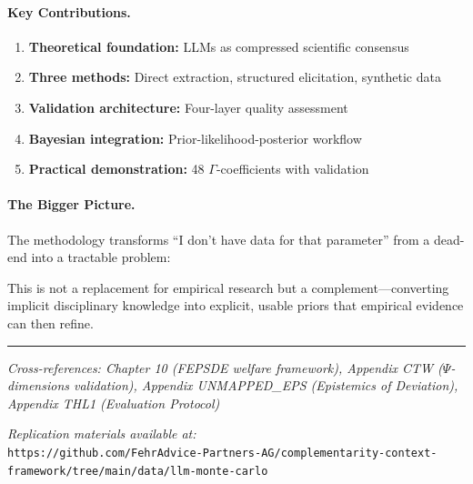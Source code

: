 \paragraph{Key Contributions.}
\begin{enumerate}
    \item \textbf{Theoretical foundation:} LLMs as compressed scientific consensus
    \item \textbf{Three methods:} Direct extraction, structured elicitation, synthetic data
    \item \textbf{Validation architecture:} Four-layer quality assessment
    \item \textbf{Bayesian integration:} Prior-likelihood-posterior workflow
    \item \textbf{Practical demonstration:} 48 $\Gamma$-coefficients with validation
\end{enumerate}

\paragraph{The Bigger Picture.}
The methodology transforms ``I don't have data for that parameter'' from a dead-end into a tractable problem:

\begin{center}
\end{center}

This is not a replacement for empirical research but a complement---converting implicit disciplinary knowledge into explicit, usable priors that empirical evidence can then refine.

\vspace{1em}
\hrule
\vspace{0.5em}
\noindent\textit{Cross-references: Chapter 10 (FEPSDE welfare framework), Appendix CTW ($\Psi$-dimensions validation), Appendix UNMAPPED_EPS (Epistemics of Deviation), Appendix THL1 (Evaluation Protocol)}

\vspace{1em}
\noindent\textit{Replication materials available at:}\\
\texttt{https://github.com/FehrAdvice-Partners-AG/complementarity-context-framework/tree/main/data/llm-monte-carlo}

